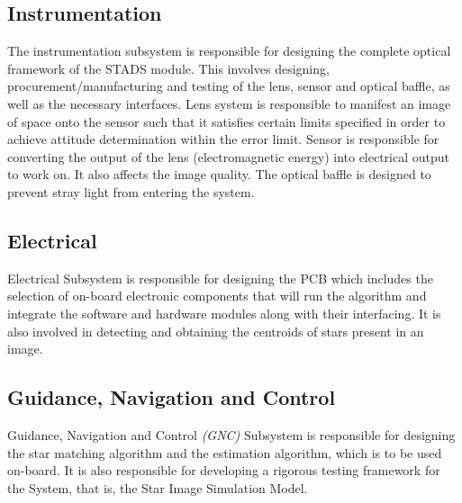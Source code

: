 \documentclass[../../main.tex]{subfiles}
\begin{document}
    \subsection*{Instrumentation}
    The instrumentation subsystem is responsible for designing the complete optical framework of the STADS module. This involves designing, procurement/manufacturing and testing of the lens, sensor and optical baffle, as well as the necessary interfaces. Lens system is responsible to manifest an image of space onto the sensor such that it satisfies certain limits specified in order to achieve attitude determination within the error limit. Sensor is responsible for converting the output of the lens (electromagnetic energy) into electrical output to work on. It also affects the image quality. The optical baffle is designed to prevent stray light from entering the system.
    

    
    \subsection*{Electrical}
        Electrical Subsystem is responsible for designing the PCB which includes the selection of on-board electronic components that will run the algorithm and integrate the software and hardware modules along with their interfacing. It is also involved in detecting and obtaining the centroids of stars present in an image.

    \subsection*{Guidance, Navigation and Control}
        Guidance, Navigation and Control \emph{(GNC)} Subsystem is responsible for designing the star matching algorithm and the estimation algorithm, which is to be used on-board. It is also responsible for developing a rigorous testing framework for the System, that is, the Star Image Simulation Model.






\end{document}
